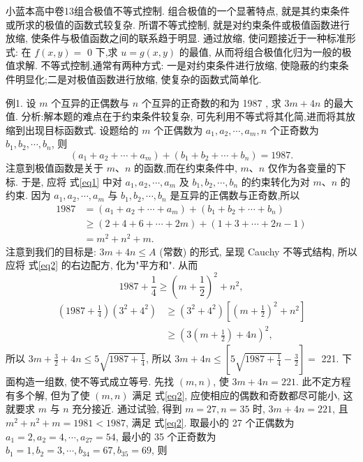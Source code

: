 
小蓝本高中卷13组合极值不等式控制.
组合极值的一个显著特点, 就是其约束条件或所求的极值的函数式较复杂.
所谓不等式控制, 就是对约束条件或极值函数进行放缩, 使条件与极值函数之间的联系趋于明显.
通过放缩, 使问题接近于一种标准形式: 在 $f(x, y)=$ 0 下,求 $u=g(x, y)$ 的最值, 从而将组合极值化归为一般的极值求解.
不等式控制,通常有两种方式: 一是对约束条件进行放缩, 使隐蔽的约束条件明显化;二是对极值函数进行放缩, 使复杂的函数式简单化.



例1. 设 $m$ 个互异的正偶数与 $n$ 个互异的正奇数的和为 1987 , 求 $3 m+ 4 n$ 的最大值.
分析:解本题的难点在于约束条件较复杂, 可先利用不等式将其化简,进而将其放缩到出现目标函数式.
设题给的 $m$ 个正偶数为 $a_1, a_2, \cdots, a_m, n$ 个正奇数为 $b_1, b_2, \cdots, b_n$, 则
$$
\left(a_1+a_2+\cdots+a_m\right)+\left(b_1+b_2+\cdots+b_n\right)=1987 . \label{eq1}
$$
注意到极值函数是关于 $m 、 n$ 的函数,而在约束条件中, $m 、 n$ 仅作为各变量的下标.
于是, 应将 式\ref{eq1} 中对 $a_1, a_2, \cdots, a_m$ 及 $b_1, b_2, \cdots, b_n$ 的约束转化为对 $m 、 n$ 的约束.
因为 $a_1, a_2, \cdots, a_m$ 与 $b_1, b_2, \cdots, b_n$ 是互异的正偶数与正奇数,所以
$$
\begin{aligned}
1987 & =\left(a_1+a_2+\cdots+a_m\right)+\left(b_1+b_2+\cdots+b_n\right) \\
& \geqslant(2+4+6+\cdots+2 m)+(1+3+\cdots+2 n-1) \\
& =m^2+n^2+m . \label{eq2}
\end{aligned}
$$
注意到我们的目标是: $3 m+4 n \leqslant A$ (常数) 的形式, 呈现 Cauchy 不等式结构, 所以应将 式\ref{eq2} 的右边配方, 化为"平方和". 从而
$$
1987+\frac{1}{4} \geqslant\left(m+\frac{1}{2}\right)^2+n^2,
$$
$$
\begin{aligned}
\left(1987+\frac{1}{4}\right)\left(3^2+4^2\right) & \geqslant\left(3^2+4^2\right)\left[\left(m+\frac{1}{2}\right)^2+n^2\right] \\
& \geqslant\left(3\left(m+\frac{1}{2}\right)+4 n\right)^2,
\end{aligned}
$$
所以 $3 m+\frac{3}{2}+4 n \leqslant 5 \sqrt{1987+\frac{1}{4}}$, 所以 $3 m+4 n \leqslant\left[5 \sqrt{1987+\frac{1}{4}}-\frac{3}{2}\right]=$ 221.
下面构造一组数, 使不等式成立等号.
先找 $(m, n)$, 使 $3 m+4 n=221$.
此不定方程有多个解, 但为了使 $(m, n)$ 满足 式\ref{eq2}, 应使相应的偶数和奇数都尽可能小, 这就要求 $m$ 与 $n$ 充分接近.
通过试验, 得到 $m=27, n=35$ 时, $3 m+4 n=221$, 且 $m^2+n^2+m=1981<1987$, 满足 式\ref{eq2}.
取最小的 27 个正偶数为 $a_1=2, a_2=4, \cdots, a_{27}=54$, 最小的 35 个正奇数为 $b_1=1, b_2=3, \cdots, b_{34}=67, b_{35}=69$, 则
